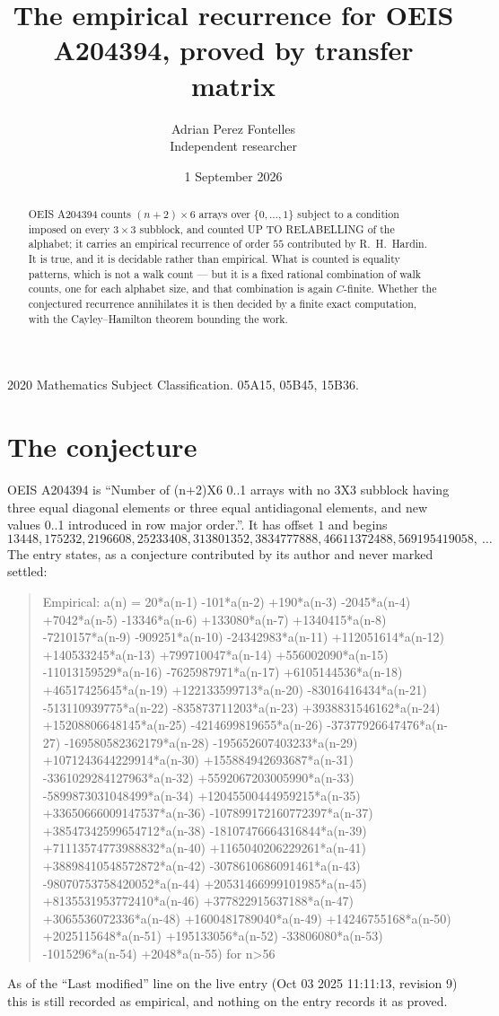 \documentclass[11pt,a4paper]{article}
\title{The empirical recurrence for OEIS A204394, proved by transfer matrix}
\author{Adrian Perez Fontelles\\ \small Independent researcher}
\date{1 September 2026}
\theoremstyle{plain}
\theoremstyle{definition}
\begin{document}
\maketitle

\begin{abstract}
OEIS A204394 counts $(n+2)\times6$ arrays over $\{0,\dots,1\}$ subject to a condition imposed on
every $3\times3$ subblock, and counted UP TO RELABELLING of the
alphabet; it carries an empirical recurrence of order $55$ contributed by
R.~H.~Hardin. It is true, and it is decidable rather than empirical. What is counted is
equality patterns, which is not a walk count --- but it is a fixed rational combination of
walk counts, one for each alphabet size, and that combination is again $C$-finite. Whether the
conjectured recurrence annihilates it is then decided by a finite exact computation, with the
Cayley--Hamilton theorem bounding the work.
\end{abstract}

\noindent\small 2020 Mathematics Subject Classification. 05A15, 05B45, 15B36.\normalsize

\section{The conjecture}

OEIS A204394 is ``Number of (n+2)X6 0..1 arrays with no 3X3 subblock having three equal diagonal elements or three equal antidiagonal elements, and new values 0..1 introduced in row major order.''. It has offset $1$ and begins
\[
13448, 175232, 2196608, 25233408, 313801352, 3834777888, 46611372488, 569195419058,\ \dots
\]
The entry states, as a conjecture contributed by its author and never marked settled:
\begin{quote}
Empirical: a(n) = 20*a(n-1) -101*a(n-2) +190*a(n-3) -2045*a(n-4) +7042*a(n-5) -13346*a(n-6) +133080*a(n-7) +1340415*a(n-8) -7210157*a(n-9) -909251*a(n-10) -24342983*a(n-11) +112051614*a(n-12) +140533245*a(n-13) +799710047*a(n-14) +556002090*a(n-15) -11013159529*a(n-16) -7625987971*a(n-17) +6105144536*a(n-18) +46517425645*a(n-19) +122133599713*a(n-20) -83016416434*a(n-21) -513110939775*a(n-22) -835873711203*a(n-23) +3938831546162*a(n-24) +15208806648145*a(n-25) -4214699819655*a(n-26) -37377926647476*a(n-27) -169580582362179*a(n-28) -195652607403233*a(n-29) +1071243644229914*a(n-30) +155884942693687*a(n-31) -3361029284127963*a(n-32) +5592067203005990*a(n-33) -5899873031048499*a(n-34) +12045500444959215*a(n-35) +33650666009147537*a(n-36) -107899172160772397*a(n-37) +38547342599654712*a(n-38) -18107476664316844*a(n-39) +71113574773988832*a(n-40) +1165040206229261*a(n-41) +38898410548572872*a(n-42) -3078610686091461*a(n-43) -98070753758420052*a(n-44) +20531466999101985*a(n-45) +8135531953772410*a(n-46) +377822915637188*a(n-47) +3065536072336*a(n-48) +1600481789040*a(n-49) +14246755168*a(n-50) +2025115648*a(n-51) +195133056*a(n-52) -33806080*a(n-53) -1015296*a(n-54) +2048*a(n-55) for n>56
\end{quote}
As of the ``Last modified'' line on the live entry (Oct 03 2025 11:11:13, revision 9) this is still
recorded as empirical, and nothing on the entry records it as proved.
\end{document}
